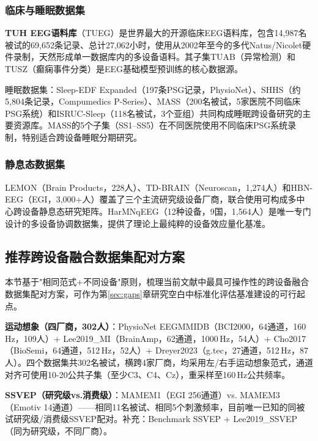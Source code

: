 \documentclass[12pt, a4paper]{article}
\begin{document}
\subsubsection{临床与睡眠数据集}

\textbf{TUH EEG语料库}（TUEG）\citep{Obeid2016TUH}是世界最大的开源临床EEG语料库，包含14,987名被试的69,652条记录、总计27,062小时，使用从2002年至今的多代Natus/Nicolet硬件录制，天然形成单一数据库内的多设备语料。其子集TUAB（异常检测）和TUSZ（癫痫事件分类）是EEG基础模型预训练的核心数据源。

睡眠数据集：Sleep-EDF Expanded（197条PSG记录，PhysioNet）、SHHS（约5,804条记录，Compumedics P-Series）\citep{SHHS2000}、MASS（200名被试，5家医院不同临床PSG系统）和ISRUC-Sleep（118名被试，3个亚组）\citep{ISRUC2016}共同构成睡眠跨设备研究的主要资源库。MASS的5个子集（SS1--SS5）在不同医院使用不同临床PSG系统录制，特别适合跨设备睡眠分期研究。

\subsubsection{静息态数据集}

LEMON\citep{Babayan2019LEMON}（Brain Products，228人）、TD-BRAIN\citep{vanDijk2022TDBRAIN}（Neuroscan，1,274人）和HBN-EEG\citep{Alexander2017HBN}（EGI，3,000+人）覆盖了三个主流研究级设备厂商，联合使用可构成多中心跨设备静息态研究矩阵。HarMNqEEG\citep{Li2022HarMNqEEG}（12种设备，9国，1,564人）是唯一专门设计的多设备协调数据集，提供了理论上最纯粹的设备效应量化基准。

\subsection{推荐跨设备融合数据集配对方案}
\label{sec:dataset_pairing}

本节基于"相同范式+不同设备"原则，梳理当前文献中最具可操作性的跨设备融合数据集配对方案，可作为第\ref{sec:gaps}章研究空白中标准化评估基准建设的可行起点。

\textbf{运动想象（四厂商，302人）}：PhysioNet EEGMMIDB\citep{PhysioNetMotor}（BCI2000，64通道，160\,Hz，109人）+ Lee2019\_MI\citep{Lee2019OpenBMI}（BrainAmp，62通道，1000\,Hz，54人）+ Cho2017\citep{Cho2017MI}（BioSemi，64通道，512\,Hz，52人）+ Dreyer2023\citep{Dreyer2023MI}（g.tec，27通道，512\,Hz，87人）。四个数据集共302名被试，横跨4家厂商，均采用左/右手运动想象范式，通道对齐可使用10-20公共子集（至少C3、C4、Cz），重采样至160\,Hz公共频率。

\textbf{SSVEP（研究级vs.消费级）}：MAMEM1（EGI 256通道）vs. MAMEM3（Emotiv 14通道）\citep{MAMEM2016}——相同11名被试、相同5个刺激频率，目前唯一已知的同被试研究级/消费级SSVEP配对。补充：Benchmark SSVEP + Lee2019\_SSVEP（同为研究级，不同厂商）。
\end{document}
